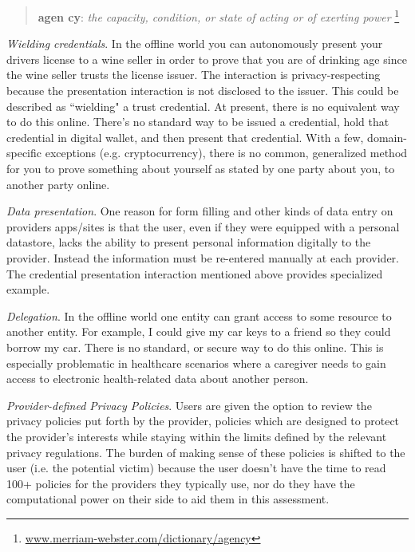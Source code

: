 \documentclass[11pt, oneside]{article}   	%
\newcommand{\hyperfootnote}[1][]{\def\ArgI{{#1}}\hyperfootnoteRelay}
\newcommand\hyperfootnoteRelay[2][]{\href{#1#2}{\ArgI}\footnote{\href{#1#2}{#2}}}
\begin{document}
\begin{quote}
\textbf{a\hspace{0.5mm}\tiny {}\normalsize \hspace{0.5mm}gen \tiny {} \normalsize cy}: \emph{the capacity, condition, or state of acting or of exerting power} \hyperfootnote[][https://]{www.merriam-webster.com/dictionary/agency}
\end{quote}

\emph{Wielding credentials}. In the offline world you can autonomously present your drivers license to a wine seller in order to prove that you are of drinking age since the wine seller trusts the license issuer. The interaction is privacy-respecting because the presentation interaction is not disclosed to the issuer. This could be described as ``wielding" a trust credential. At present, there is no equivalent way to do this online. There's no standard way to be issued a credential, hold that credential in digital wallet, and then present that credential. With a few, domain-specific exceptions (e.g. cryptocurrency), there is no common, generalized method for you to prove something about yourself as stated by one party about you, to another party online.

\emph{Data presentation}. One reason for form filling and other kinds of data entry on providers apps/sites is that the user, even if they were equipped with a personal datastore, lacks the ability to present personal information digitally to the provider. Instead the information must be re-entered manually at each provider. The credential presentation interaction mentioned above provides specialized example.

\emph{Delegation}. In the offline world one entity can grant access to some resource to another entity. For example, I could give my car keys to a friend so they could borrow my car. There is no standard, or secure way to do this online. This is especially problematic in healthcare scenarios where a caregiver needs to gain access to electronic health-related data about another person.

\emph{Provider-defined Privacy Policies}. Users are given the option to review the privacy policies put forth by the provider, policies which are designed to protect the provider's interests while staying within the limits defined by the relevant privacy regulations. The burden of making sense of these policies is shifted to the user (i.e. the potential victim) because the user doesn't have the time to read 100+ policies for the providers they typically use, nor do they have the computational power on their side to aid them in this assessment. 
\end{document}

